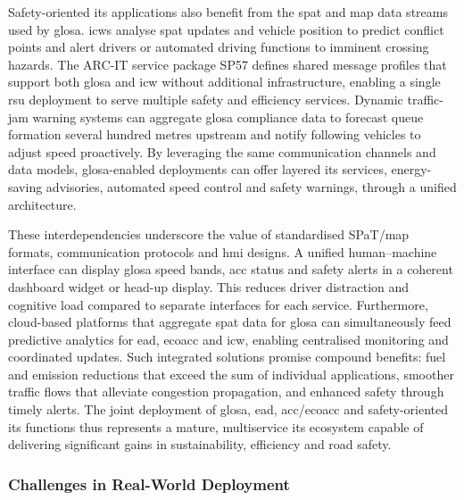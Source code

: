 Safety-oriented \ac{its} applications also benefit from the \ac{spat} and \ac{map} data streams used by \ac{glosa}. \acp{icw} analyse \ac{spat} updates and vehicle position to predict conflict points and alert drivers or automated driving functions to imminent crossing hazards. The ARC-IT service package SP57 defines shared message profiles that support both \ac{glosa} and \ac{icw} without additional infrastructure, enabling a single \ac{rsu} deployment to serve multiple safety and efficiency services. \cite{ARCITSP57} Dynamic traffic-jam warning systems can aggregate \ac{glosa} compliance data to forecast queue formation several hundred metres upstream and notify following vehicles to adjust speed proactively. By leveraging the same communication channels and data models, \ac{glosa}-enabled deployments can offer layered \ac{its} services, energy-saving advisories, automated speed control and safety warnings, through a unified architecture.

These interdependencies underscore the value of standardised SPaT/\ac{map} formats, communication protocols and \ac{hmi} designs. A unified human–machine interface can display \ac{glosa} speed bands, \ac{acc} status and safety alerts in a coherent dashboard widget or head-up display. This reduces driver distraction and cognitive load compared to separate interfaces for each service. Furthermore, cloud-based platforms that aggregate \ac{spat} data for \ac{glosa} can simultaneously feed predictive analytics for \ac{ead}, \ac{ecoacc} and \ac{icw}, enabling centralised monitoring and coordinated updates. Such integrated solutions promise compound benefits: fuel and emission reductions that exceed the sum of individual applications, smoother traffic flows that alleviate congestion propagation, and enhanced safety through timely alerts. The joint deployment of \ac{glosa}, \ac{ead}, \ac{acc}/\ac{ecoacc} and safety-oriented \ac{its} functions thus represents a mature, multiservice \ac{its} ecosystem capable of delivering significant gains in sustainability, efficiency and road safety.


\subsubsection{Challenges in Real-World Deployment}
\label{subsubsec:deployment_challenges}

